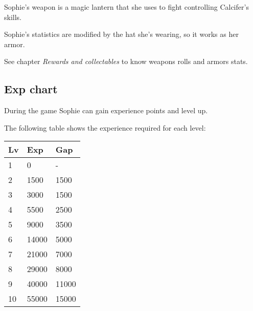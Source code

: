 Sophie's weapon is a magic lantern that she uses to fight controlling Calcifer's skills.

Sophie's statistics are modified by the hat she's wearing, so it works as her armor.

See chapter \textit{Rewards and collectables} to know weapons rolls and armors stats.

\subsection{Exp chart}
During the game Sophie can gain experience points and level up.

The following table shows the experience required for each level:
\begin{table}[H]
\centering
\begin{tabular}{|l|l|l|}
\hline
\rowcolor[HTML]{C0C0C0} 
\textbf{Lv} & \textbf{Exp} & \textbf{Gap} \\ \hline
1 & 0 & - \\ \hline
2 & 1500 & 1500 \\ \hline
3 & 3000 & 1500 \\ \hline
4 & 5500 & 2500 \\ \hline
5 & 9000 & 3500 \\ \hline
6 & 14000 & 5000 \\ \hline
7 & 21000 & 7000 \\ \hline
8 & 29000 & 8000 \\ \hline
9 & 40000 & 11000 \\ \hline
10 & 55000 & 15000 \\ \hline
\end{tabular}
\end{table}


